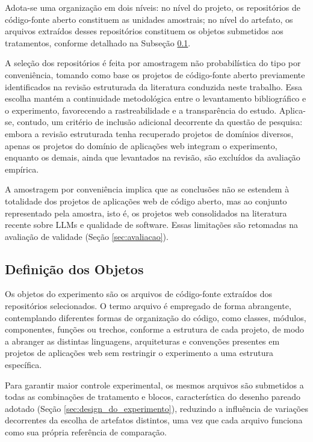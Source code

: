 Adota-se uma organização em dois níveis: no nível do projeto, os repositórios de código-fonte aberto constituem as unidades amostrais; no nível do artefato, os arquivos extraídos desses repositórios constituem os objetos submetidos aos tratamentos, conforme detalhado na Subseção \ref{sec:objetos}.

A seleção dos repositórios é feita por amostragem não probabilística do tipo por conveniência, tomando como base os projetos de código-fonte aberto previamente identificados na revisão estruturada da literatura conduzida neste trabalho. Essa escolha mantém a continuidade metodológica entre o levantamento bibliográfico e o experimento, favorecendo a rastreabilidade e a transparência do estudo. Aplica-se, contudo, um critério de inclusão adicional decorrente da questão de pesquisa: embora a revisão estruturada tenha recuperado projetos de domínios diversos, apenas os projetos do domínio de aplicações web integram o experimento, enquanto os demais, ainda que levantados na revisão, são excluídos da avaliação empírica.

A amostragem por conveniência implica que as conclusões não se estendem à totalidade dos projetos de aplicações web de código aberto, mas ao conjunto representado pela amostra, isto é, os projetos web consolidados na literatura recente sobre LLMs e qualidade de software. Essas limitações são retomadas na avaliação de validade (Seção \ref{sec:avaliacao}).

\subsection{Definição dos Objetos}
\label{sec:objetos}

Os objetos do experimento são os arquivos de código-fonte extraídos dos repositórios selecionados. O termo arquivo é empregado de forma abrangente, contemplando diferentes formas de organização do código, como classes, módulos, componentes, funções ou trechos, conforme a estrutura de cada projeto, de modo a abranger as distintas linguagens, arquiteturas e convenções presentes em projetos de aplicações web sem restringir o experimento a uma estrutura específica.

Para garantir maior controle experimental, os mesmos arquivos são submetidos a todas as combinações de tratamento e blocos, característica do desenho pareado adotado (Seção \ref{sec:design_do_experimento}), reduzindo a influência de variações decorrentes da escolha de artefatos distintos, uma vez que cada arquivo funciona como sua própria referência de comparação.

